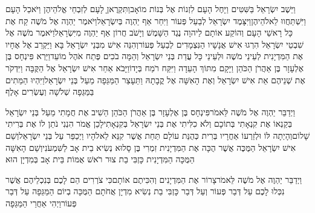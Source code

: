 \documentclass[../main/main.tex]{subfiles}
\begin{document}
\begin{multicols*}{\ncols}
וַיֵּשֶׁב יִשְׂרָאֵל בַּשִּׁטִּים וַיָּחֶל הָעָם לִזְנוֹת אֶל בְּנוֹת מוֹאָב\PreVerseSpace{}וַתִּקְרֶאןָ לָעָם לְזִבְחֵי אֱלֹהֵיהֶן וַיֹּאכַל הָעָם וַיִּשְׁתַּחֲווּ לֵאלֹהֵיהֶן\PreVerseSpace{}וַיִּצָּמֶד יִשְׂרָאֵל לְבַעַל פְּעוֹר וַיִּחַר אַף יַהְוֶה בְּיִשְׂרָאֵל\PreVerseSpace{}וַיֹּאמֶר יַהְוֶה אֶל מֹשֶׁה קַח אֶת כָּל רָאשֵׁי הָעָם וְהוֹקַע אוֹתָם לַיהוָה נֶגֶד הַשָּׁמֶשׁ וְיָשֹׁב חֲרוֹן אַף יַהְוֶה מִיִּשְׂרָאֵל\PreVerseSpace{}וַיֹּאמֶר מֹשֶׁה אֶל שִׁבְטֵי\SubEnd{} יִשְׂרָאֵל הִרְגוּ אִישׁ אֲנָשָׁיו הַנִּצְמָדִים לְבַעַל פְּעוֹר\PreVerseSpace{}וְהִנֵּה אִישׁ מִבְּנֵי יִשְׂרָאֵל בָּא וַיַּקְרֵב אֶל אֶחָיו אֶת הַמִּדְיָנִית לְעֵינֵי מֹשֶׁה וּלְעֵינֵי כָּל עֲדַת בְּנֵי יִשְׂרָאֵל וְהֵמָּה בֹכִים פֶּתַח אֹהֶל מוֹעֵד\PreVerseSpace{}וַיַּרְא פִּינְחָס בֶּן אֶלְעָזָר בֶּן אַהֲרֹן הַכֹּהֵן וַיָּקָם מִתּוֹךְ הָעֵדָה וַיִּקַּח רֹמַח בְּיָדוֹ\PreVerseSpace{}וַיָּבֹא אַחַר אִישׁ יִשְׂרָאֵל אֶל הַקֻּבָּה וַיִּדְקֹר אֶת שְׁנֵיהֶם אֵת אִישׁ יִשְׂרָאֵל וְאֶת הָאִשָּׁה אֶל קֳבָתָהּ וַתֵּעָצַר הַמַּגֵּפָה מֵעַל בְּנֵי יִשְׂרָאֵל\PreVerseSpace{}וַיִּהְיוּ הַמֵּתִים בַּמַּגֵּפָה שְׁלֹשָׁה\SubEnd{} וְעֶשְׂרִים אָלֶף\OpenSection{}\par
{}וַיְדַבֵּר יַהְוֶה אֶל מֹשֶׁה לֵּאמֹר\PreVerseSpace{}פִּינְחָס בֶּן אֶלְעָזָר בֶּן אַהֲרֹן הַכֹּהֵן הֵשִׁיב אֶת חֲמָתִי מֵעַל בְּנֵי יִשְׂרָאֵל בְּקַנְאוֹ אֶת קִנְאָתִי בְּתוֹכָם וְלֹא כִלִּיתִי אֶת בְּנֵי יִשְׂרָאֵל בְּקִנְאָתִי\PreVerseSpace{}לָכֵן אֱמֹר הִנְנִי נֹתֵן לוֹ אֶת בְּרִיתִי שָׁלוֹם\PreVerseSpace{}וְהָיְתָה לּוֹ וּלְזַרְעוֹ אַחֲרָיו בְּרִית כְּהֻנַּת עוֹלָם תַּחַת אֲשֶׁר קִנֵּא לֵאלֹהָיו וַיְכַפֵּר עַל בְּנֵי יִשְׂרָאֵל\PreVerseSpace{}וְשֵׁם אִישׁ יִשְׂרָאֵל הַמֻּכֶּה אֲשֶׁר הֻכָּה אֶת הַמִּדְיָנִית זִמְרִי בֶּן סָלוּא נְשִׂיא בֵית אָב לַשִּׁמְעֹנִי\PreVerseSpace{}וְשֵׁם הָאִשָּׁה הַמֻּכָּה הַמִּדְיָנִית כָּזְבִּי בַת צוּר רֹאשׁ אֻמּוֹת בֵּית אָב בְּמִדְיָן הוּא\OpenSection{}\par
{}וַיְדַבֵּר יַהְוֶה אֶל מֹשֶׁה לֵּאמֹר\PreVerseSpace{}צָרוֹר אֶת הַמִּדְיָנִים וְהִכִּיתֶם אוֹתָם\PreVerseSpace{}כִּי צֹרְרִים הֵם לָכֶם בְּנִכְלֵיהֶם אֲשֶׁר נִכְּלוּ לָכֶם עַל דְּבַר פְּעוֹר וְעַל דְּבַר כָּזְבִּי בַת נְשִׂיא מִדְיָן אֲחֹתָם הַמֻּכָּה בְיוֹם הַמַּגֵּפָה עַל דְּבַר פְּעוֹר\PreVerseSpace{}וַיְהִי אַחֲרֵי הַמַּגֵּפָה\OpenSection{}\par

\end{multicols*}
\end{document}
